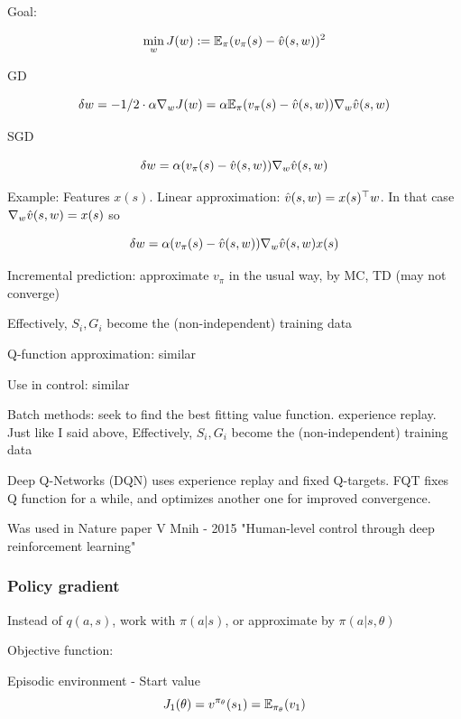 \documentclass[english]{article}
\begin{document}
Goal: 

$$\min_w J(w):=\mathbb{E}_\pi(v_\pi(s)-\hat{v}(s,w))^2
$$

GD

$$\delta w=-1/2\cdot\alpha \nabla_w J(w)
=\alpha\mathbb{E}_\pi(v_\pi(s)-\hat{v}(s,w))\nabla_w\hat{v}(s,w)
$$

SGD

$$\delta w
=\alpha(v_\pi(s)-\hat{v}(s,w))\nabla_w\hat{v}(s,w)
$$



\item Example:  Features $x(s)$. Linear approximation: $\hat{v}(s,w) =x(s)^\top w$. In that case $\nabla_w\hat{v}(s,w) = x(s)$ so


$$\delta w
=\alpha(v_\pi(s)-\hat{v}(s,w))\nabla_w\hat{v}(s,w)x(s)
$$

\item Incremental prediction: approximate $v_\pi$ in the usual way, by MC, TD (may not converge)

Effectively, $S_i,G_i$ become the (non-independent) training data

\item Q-function approximation: similar

Use in control: similar

\item Batch methods: seek to find the best fitting value function. experience replay. Just like I said above, Effectively, $S_i,G_i$ become the (non-independent) training data


\item Deep Q-Networks (DQN) uses experience replay and fixed Q-targets. FQT fixes Q function for a while, and optimizes another one for improved convergence. 

Was used in Nature paper V Mnih - 2015 "Human-level control through deep reinforcement learning"

\eenum 




\subsubsection{Policy gradient}
\benum

\item Instead of $q(a,s)$, work with $\pi(a|s)$, or approximate by $\pi(a|s,\theta)$

\item Objective function: 

Episodic environment - Start value 
$$J_1(\theta) 
=
v^{\pi_\theta}(s_1) 
=
\mathbb{E}_{\pi_\theta}(v_1)$$
\end{document}
